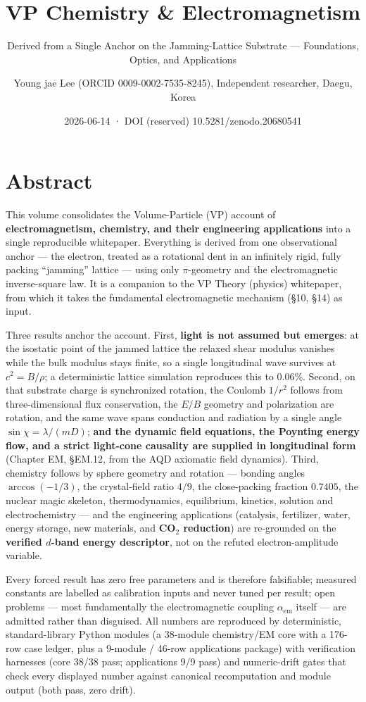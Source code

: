 \documentclass[
  10pt,
]{article}
\title{VP Chemistry \& Electromagnetism}
\subtitle{Derived from a Single Anchor on the Jamming-Lattice Substrate
--- Foundations, Optics, and Applications}
\author{Young jae Lee (ORCID 0009-0002-7535-8245), Independent
researcher, Daegu, Korea}
\date{2026-06-14 · DOI (reserved) 10.5281/zenodo.20680541}
\begin{document}
\maketitle

{
\hypersetup{linkcolor=}
\setcounter{tocdepth}{2}
\tableofcontents
}
\hypertarget{abstract}{%
\section{Abstract}\label{abstract}}

This volume consolidates the Volume-Particle (VP) account of
\textbf{electromagnetism, chemistry, and their engineering applications}
into a single reproducible whitepaper. Everything is derived from one
observational anchor --- the electron, treated as a rotational dent in
an infinitely rigid, fully packing ``jamming'' lattice --- using only
\(\pi\)-geometry and the electromagnetic inverse-square law. It is a
companion to the VP Theory (physics) whitepaper, from which it takes the
fundamental electromagnetic mechanism (§10, §14) as input.

Three results anchor the account. First, \textbf{light is not assumed
but emerges}: at the isostatic point of the jammed lattice the relaxed
shear modulus vanishes while the bulk modulus stays finite, so a single
longitudinal wave survives at \(c^2 = B/\rho\); a deterministic lattice
simulation reproduces this to 0.06\%. Second, on that substrate charge
is synchronized rotation, the Coulomb \(1/r^2\) follows from
three-dimensional flux conservation, the \(E/B\) geometry and
polarization are rotation, and the same wave spans conduction and
radiation by a single angle \(\sin\chi=\lambda/(mD)\); \textbf{and the
dynamic field equations, the Poynting energy flow, and a strict
light-cone causality are supplied in longitudinal form} (Chapter EM,
§EM.12, from the AQD axiomatic field dynamics). Third, chemistry follows
by sphere geometry and rotation --- bonding angles \(\arccos(-1/3)\),
the crystal-field ratio \(4/9\), the close-packing fraction \(0.7405\),
the nuclear magic skeleton, thermodynamics, equilibrium, kinetics,
solution and electrochemistry --- and the engineering applications
(catalysis, fertilizer, water, energy storage, new materials, and
\textbf{CO\(_2\) reduction}) are re-grounded on the \textbf{verified
\(d\)-band energy descriptor}, not on the refuted electron-amplitude
variable.

Every forced result has zero free parameters and is therefore
falsifiable; measured constants are labelled as calibration inputs and
never tuned per result; open problems --- most fundamentally the
electromagnetic coupling \(\alpha_{\mathrm{em}}\) itself --- are
admitted rather than disguised. All numbers are reproduced by
deterministic, standard-library Python modules (a 38-module chemistry/EM
core with a 176-row case ledger, plus a 9-module / 46-row applications
package) with verification harnesses (core 38/38 pass; applications 9/9
pass) and numeric-drift gates that check every displayed number against
canonical recomputation and module output (both pass, zero drift).
\end{document}
